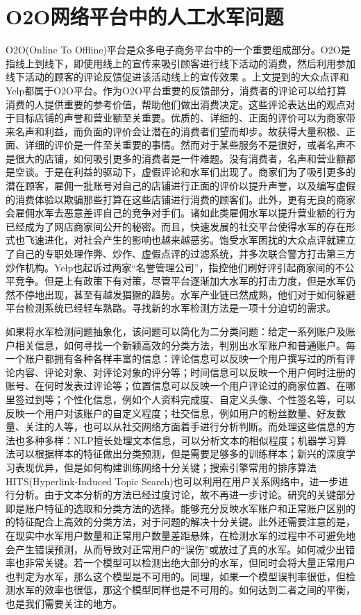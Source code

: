 \section{O2O网络平台中的人工水军问题}

O2O(Online To Offline)平台是众多电子商务平台中的一个重要组成部分。O2O是指线上到线下，即使用线上的宣传来吸引顾客进行线下活动的消费，然后利用参加线下活动的顾客的评论反馈促进该活动线上的宣传效果 \cite{Wei:2014}。上文提到的大众点评和Yelp都属于O2O平台。作为O2O平台重要的反馈部分，消费者的评论可以给打算消费的人提供重要的参考价值，帮助他们做出消费决定。这些评论表达出的观点对于目标店铺的声誉和营业额至关重要。优质的、详细的、正面的评价可以为商家带来名声和利益，而负面的评价会让潜在的消费者们望而却步。故获得大量积极、正面、详细的评价是一件至关重要的事情。然而对于某些服务不是很好，或者名声不是很大的店铺，如何吸引更多的消费者是一件难题。没有消费者，名声和营业额都是空谈。于是在利益的驱动下，虚假评论和水军们出现了。商家们为了吸引更多的潜在顾客，雇佣一批账号对自己的店铺进行正面的评价以提升声誉，以及编写虚假的消费体验以欺骗那些打算在这些店铺进行消费的顾客们。此外，更有无良的商家会雇佣水军去恶意差评自己的竞争对手们\cite{Gupta:2017}。诸如此类雇佣水军以提升营业额的行为已经成为了网店商家间公开的秘密。而且，快速发展的社交平台使得水军的存在形式也飞速进化，对社会产生的影响也越来越恶劣\cite{CHAKRABORTY:2016}。饱受水军困扰的大众点评就建立了自己的专职处理作弊、炒作、虚假点评的过滤系统，并多次联合警方打击第三方炒作机构。Yelp也起诉过两家“名誉管理公司”，指控他们刷好评引起商家间的不公平竞争。但是上有政策下有对策，尽管平台逐渐加大水军的打击力度，但是水军仍然不停地出现，甚至有越发猖獗的趋势。水军产业链已然成熟，他们对于如何躲避平台检测系统已经轻车熟路。寻找新的水军检测方法是一项十分迫切的需求。

如果将水军检测问题抽象化，该问题可以简化为二分类问题：给定一系列账户及账户相关信息，如何寻找一个新颖高效的分类方法，判别出水军账户和普通账户。每一个账户都拥有各种各样丰富的信息：评论信息可以反映一个用户撰写过的所有评论内容、评论对象、对评论对象的评分等；时间信息可以反映一个用户何时注册的账号、在何时发表过评论等；位置信息可以反映一个用户评论过的商家位置、在哪里签过到等；个性化信息，例如个人资料完成度、自定义头像、个性签名等，可以反映一个用户对该账户的自定义程度；社交信息，例如用户的粉丝数量、好友数量、关注的人等，也可以从社交网络方面着手进行分析判断。而处理这些信息的方法也多种多样：NLP擅长处理文本信息，可以分析文本的相似程度；机器学习算法可以根据样本的特征做出分类预测，但是需要足够多的训练样本；新兴的深度学习表现优异，但是如何构建训练网络十分关键；搜索引擎常用的排序算法HITS(Hyperlink-Induced Topic Search)也可以利用在用户关系网络中，进一步进行分析。由于文本分析的方法已经过度讨论，故不再进一步讨论。研究的关键部分即是账户特征的选取和分类方法的选择。能够充分反映水军账户和正常账户区别的的特征配合上高效的分类方法，对于问题的解决十分关键。此外还需要注意的是，在现实中水军用户数量和正常用户数量差距悬殊，在检测水军的过程中不可避免地会产生错误预测，从而导致对正常用户的“误伤”或放过了真的水军。如何减少出错率也非常关键。若一个模型可以检测出绝大部分的水军，但同时会将大量正常用户也判定为水军，那么这个模型是不可用的。同理，如果一个模型误判率很低，但检测水军的效率也很低，那这个模型同样也是不可用的。如何达到二者之间的平衡，也是我们需要关注的地方。

